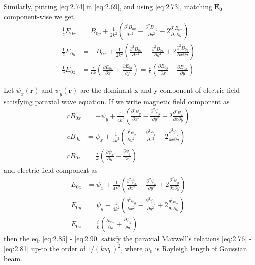 \documentclass[11pt,a4paper]{article}
\numberwithin{equation}{section}
\begin{document}
Similarly, putting \ref{eq:2.74} in \ref{eq:2.69}, and using \ref{eq:2.73}, matching $\boldsymbol{E_0}$ component-wise we get,
\begin{align}
	\frac{1}{c}E_{0x} &=
	 B_{0y} + \frac{1}{2k^2}\left( \frac{\partial^2 B_{0y}}{\partial x^2} - \frac{\partial^2 B_{0y}}{\partial y^2} - 2\frac{\partial^2 B_{0x}}{\partial x\partial y} \right)\\
	\frac{1}{c}E_{0y} &= 
	-B_{0x} + \frac{1}{2k^2}\left( \frac{\partial^2 B_{0x}}{\partial x^2} - \frac{\partial^2 B_{0x}}{\partial y^2} + 2\frac{\partial^2 B_{0y}}{\partial x\partial y} \right)\\
	\frac{1}{c}E_{0z} &= \frac{i}{ck}\left(\frac{\partial E_{0x}}{\partial x}+ \frac{\partial E_{0y}}{\partial y}\right) = \frac{i}{k}\left(\frac{\partial B_{0y}}{\partial x}-\frac{\partial B_{0x}}{\partial y}\right)\label{eq:2.81}
\end{align}

Let $\psi_x(\boldsymbol{r})$ and $\psi_y(\boldsymbol{r})$ are the dominant x and y component of electric field satisfying paraxial wave equation. If we write magnetic field component as \cite{erikson 94}
\begin{align}
	cB_{0x} &= 
	-\psi_y + \frac{1}{4k^2}\left( \frac{\partial^2 \psi_y}{\partial x^2} - \frac{\partial^2 \psi_y}{\partial y^2} + 2\frac{\partial^2 \psi_x}{\partial x\partial y} \right)\label{eq:2.85}\\
	cB_{0y} &= 
	\psi_x + \frac{1}{4k^2}\left( \frac{\partial^2 \psi_x}{\partial y^2} - \frac{\partial^2 \psi_x}{\partial x^2} - 2\frac{\partial^2 \psi_y}{\partial x\partial y} \right)\\
	cB_{0z} &= 
	\frac{i}{k}\left(\frac{\partial \psi_x}{\partial y}-\frac{\partial \psi_y}{\partial x}\right)
\end{align}
and electric field component as \cite{erikson 94}
\begin{align}
	E_{0x} &=
	\psi_x + \frac{1}{4k^2}\left( \frac{\partial^2 \psi_x}{\partial x^2} - \frac{\partial^2 \psi_x}{\partial y^2} + 2\frac{\partial^2 \psi_y}{\partial x\partial y} \right)\\
	E_{0y} &= 
	\psi_y - \frac{1}{4k^2}\left( \frac{\partial^2 \psi_y}{\partial x^2} - \frac{\partial^2 \psi_y}{\partial y^2} + 2\frac{\partial^2 \psi_x}{\partial x\partial y} \right)\\
	E_{0z} &= 
	\frac{i}{k}\left(\frac{\partial \psi_x}{\partial x}+\frac{\partial \psi_y}{\partial y}\right)\label{eq:2.90}
\end{align}
then the eq. \ref{eq:2.85} - \ref{eq:2.90} satisfy the paraxial Maxwell's relations \ref{eq:2.76} - \ref{eq:2.81} up-to the order of $1/(kw_0)^2$, where $w_0$ is Rayleigh length of Gaussian beam.
\end{document}
